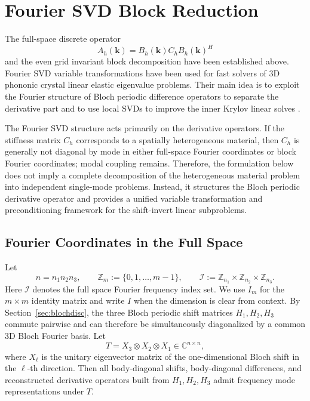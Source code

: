 \documentclass[11pt,oneside]{article}
\numberwithin{equation}{section}
\theoremstyle{plain}
\theoremstyle{remark}
\newcommand{\bk}{\bm{k}}
\begin{document}
\section{Fourier SVD Block Reduction}
\label{sec:block_wsvd}

The full-space discrete operator
\[
A_h(\bk)=B_h(\bk)C_hB_h(\bk)^H
\]
and the even grid invariant block decomposition have been established above. Fourier SVD variable transformations have been used for fast solvers of 3D phononic crystal linear elastic eigenvalue problems. Their main idea is to exploit the Fourier structure of Bloch periodic difference operators to separate the derivative part and to use local SVDs to improve the inner Krylov linear solves \cite{LyuTianLiLin2024JSC}.

The Fourier SVD structure acts primarily on the derivative operators. If the stiffness matrix \(C_h\) corresponds to a spatially heterogeneous material, then \(C_h\) is generally not diagonal by mode in either full-space Fourier coordinates or block Fourier coordinates; modal coupling remains. Therefore, the formulation below does not imply a complete decomposition of the heterogeneous material problem into independent single-mode problems. Instead, it structures the Bloch periodic derivative operator and provides a unified variable transformation and preconditioning framework for the shift-invert linear subproblems.

\subsection{Fourier Coordinates in the Full Space}

Let
\[
n=n_1n_2n_3,
\qquad
\mathbb Z_m:=\{0,1,\ldots,m-1\},
\qquad
\mathcal I:=\mathbb Z_{n_1}\times\mathbb Z_{n_2}\times\mathbb Z_{n_3}.
\]
Here \(\mathcal I\) denotes the full space Fourier frequency index set. We use \(I_m\) for the \(m\times m\) identity matrix and write \(I\) when the dimension is clear from context. By Section~\ref{sec:blochdisc}, the three Bloch periodic shift matrices \(H_1,H_2,H_3\) commute pairwise and can therefore be simultaneously diagonalized by a common 3D Bloch Fourier basis. Let
\begin{equation}\label{eq:T_full_def_unified}
T=X_3\otimes X_2\otimes X_1\in\mathbb C^{n\times n},
\end{equation}
where \(X_\ell\) is the unitary eigenvector matrix of the one-dimensional Bloch shift in the \(\ell\)-th direction. Then all body-diagonal shifts, body-diagonal differences, and reconstructed derivative operators built from \(H_1,H_2,H_3\) admit frequency mode representations under \(T\).
\end{document}
